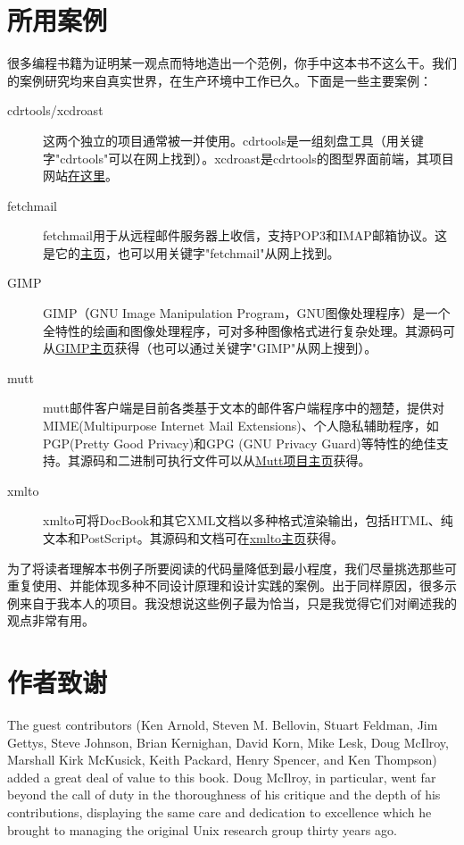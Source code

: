 \documentclass[12pt,oneside]{book}
\begin{document}
\begin{common-format}
\section{所用案例}
很多编程书籍为证明某一观点而特地造出一个范例，你手中这本书不这么干。我们的案例研究均来自真实世界，在生产环境中工作已久。下面是一些主要案例：
\begin{description}
\item[cdrtools/xcdroast] 这两个独立的项目通常被一并使用。cdrtools是一组刻盘工具（用关键字"cdrtools"可以在网上找到）。xcdroast是cdrtools的图型界面前端，其项目网站\href{http://www.xcdroast.org/}{在这里}。
\item[fetchmail] fetchmail用于从远程邮件服务器上收信，支持POP3和IMAP邮箱协议。这是它的\href{http://www.catb.org/~esr/fetchmail}{主页}，也可以用关键字"fetchmail"从网上找到。
\item[GIMP] GIMP（GNU Image Manipulation Program，GNU图像处理程序）是一个全特性的绘画和图像处理程序，可对多种图像格式进行复杂处理。其源码可从\href{http://www.gimp.org/}{GIMP主页}获得（也可以通过关键字"GIMP"从网上搜到）。
\item[mutt] mutt邮件客户端是目前各类基于文本的邮件客户端程序中的翘楚，提供对MIME(Multipurpose Internet Mail Extensions)、个人隐私辅助程序，如PGP(Pretty Good Privacy)和GPG (GNU Privacy Guard)等特性的绝佳支持。其源码和二进制可执行文件可以从\href{http://www.mutt.org/}{Mutt项目主页}获得。
\item[xmlto] xmlto可将DocBook和其它XML文档以多种格式渲染输出，包括HTML、纯文本和PostScript。其源码和文档可在\href{http://cyberelk.net/tim/xmlto/}{xmlto主页}获得。
\end{description}

为了将读者理解本书例子所要阅读的代码量降低到最小程度，我们尽量挑选那些可重复使用、并能体现多种不同设计原理和设计实践的案例。出于同样原因，很多示例来自于我本人的项目。我没想说这些例子最为恰当，只是我觉得它们对阐述我的观点非常有用。

\section{作者致谢}
The guest contributors (Ken Arnold, Steven M. Bellovin, Stuart Feldman, Jim Gettys, Steve Johnson, Brian Kernighan, David Korn, Mike Lesk, Doug McIlroy, Marshall Kirk McKusick, Keith Packard, Henry Spencer, and Ken Thompson) added a great deal of value to this book. Doug McIlroy, in particular, went far beyond the call of duty in the thoroughness of his critique and the depth of his contributions, displaying the same care and dedication to excellence which he brought to managing the original Unix research group thirty years ago.


\end{common-format}
\end{document}
